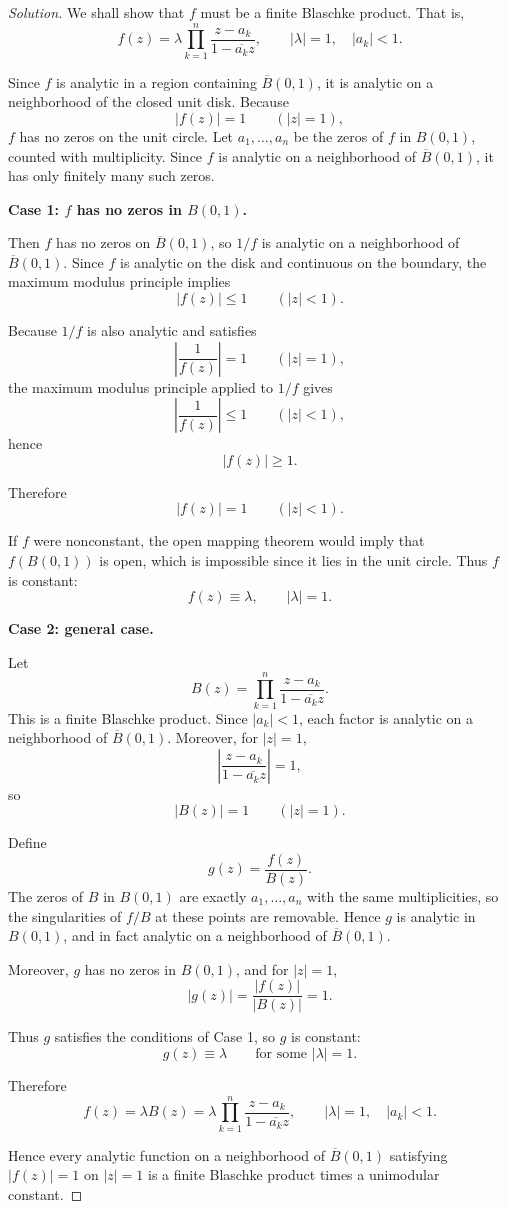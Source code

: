 \documentclass[12pt, a4paper]{report}
\theoremstyle{spaced}
\begin{document}
\begin{proof}[Solution]
	We shall show that \(f\) must be a finite Blaschke product. That is,
	\[
		f(z)=\lambda \prod_{k=1}^n \frac{z-a_k}{1-\overline{a_k}z},
		\qquad |\lambda|=1,\quad |a_k|<1.
	\]

	Since \(f\) is analytic in a region containing \(\overline{B}(0,1)\), it is analytic on a neighborhood of the closed unit disk. Because
	\[
		|f(z)|=1 \qquad (|z|=1),
	\]
	\(f\) has no zeros on the unit circle.
	Let \(a_1,\dots,a_n\) be the zeros of \(f\) in \(B(0,1)\), counted with multiplicity. Since \(f\) is analytic on a neighborhood of \(\overline{B}(0,1)\), it has only finitely many such zeros.

	\medskip
	\textbf{Case 1: \(f\) has no zeros in \(B(0,1)\).}

	Then \(f\) has no zeros on \(\overline{B}(0,1)\), so \(1/f\) is analytic on a neighborhood of \(\overline{B}(0,1)\).
	Since \(f\) is analytic on the disk and continuous on the boundary, the maximum modulus principle implies
	\[
		|f(z)| \le 1 \qquad (|z|<1).
	\]

	Because \(1/f\) is also analytic and satisfies
	\[
		\left|\frac{1}{f(z)}\right|=1 \qquad (|z|=1),
	\]
	the maximum modulus principle applied to \(1/f\) gives
	\[
		\left|\frac{1}{f(z)}\right| \le 1 \qquad (|z|<1),
	\]
	hence
	\[
		|f(z)| \ge 1.
	\]

	Therefore
	\[
		|f(z)|=1 \qquad (|z|<1).
	\]

	If \(f\) were nonconstant, the open mapping theorem would imply that \(f(B(0,1))\) is open, which is impossible since it lies in the unit circle. Thus \(f\) is constant:
	\[
		f(z)\equiv \lambda, \qquad |\lambda|=1.
	\]

	\medskip
	\textbf{Case 2: general case.}

	Let
	\[
		B(z)=\prod_{k=1}^n \frac{z-a_k}{1-\overline{a_k}z}.
	\]
	This is a finite Blaschke product. Since \(|a_k|<1\), each factor is analytic on a neighborhood of \(\overline{B}(0,1)\). Moreover, for \(|z|=1\),
	\[
		\left|\frac{z-a_k}{1-\overline{a_k}z}\right|=1,
	\]
	so
	\[
		|B(z)|=1 \qquad (|z|=1).
	\]

	Define
	\[
		g(z)=\frac{f(z)}{B(z)}.
	\]
	The zeros of \(B\) in \(B(0,1)\) are exactly \(a_1,\dots,a_n\) with the same multiplicities, so the singularities of \(f/B\) at these points are removable. Hence \(g\) is analytic in \(B(0,1)\), and in fact analytic on a neighborhood of \(\overline{B}(0,1)\).

	Moreover, \(g\) has no zeros in \(B(0,1)\), and for \(|z|=1\),
	\[
		|g(z)|=\frac{|f(z)|}{|B(z)|}=1.
	\]

	Thus \(g\) satisfies the conditions of Case 1, so \(g\) is constant:
	\[
		g(z)\equiv \lambda
		\qquad \text{for some } |\lambda|=1.
	\]

	Therefore
	\[
		f(z)=\lambda B(z)
		=\lambda \prod_{k=1}^n \frac{z-a_k}{1-\overline{a_k}z},
		\qquad |\lambda|=1,\quad |a_k|<1.
	\]

	Hence every analytic function on a neighborhood of \(\overline{B}(0,1)\) satisfying \( |f(z)|=1 \) on \( |z|=1 \) is a finite Blaschke product times a unimodular constant.
\end{proof}
\end{document}
